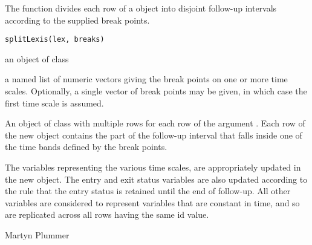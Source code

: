\begin{Description}\relax
The  function divides each row of a 
object into disjoint follow-up intervals according to the supplied
break points.
\end{Description}
\begin{Usage}
\begin{verbatim}
splitLexis(lex, breaks)
\end{verbatim}
\end{Usage}
\begin{Arguments}
\begin{ldescription}
\item[\code{lex}] an object of class 
\item[\code{breaks}] a named list of numeric vectors giving the break points
on one or more time scales. Optionally, a single vector of
break points may be given, in which case the first time scale is assumed.

\end{ldescription}
\end{Arguments}
\begin{Value}
An object of class  with multiple rows for each row of
the argument . Each row of the new  object
contains the part of the follow-up interval that falls inside one of
the time bands defined by the break points.

The variables representing the various time scales, are appropriately
updated in the new  object. The entry and exit status
variables are also updated according to the rule that the entry status
is retained until the end of follow-up. All other variables are
considered to represent variables that are constant in time, and so
are replicated across all rows having the same id value.
\end{Value}
\begin{Author}\relax
Martyn Plummer
\end{Author}
\begin{SeeAlso}\relax
{}
\end{SeeAlso}

